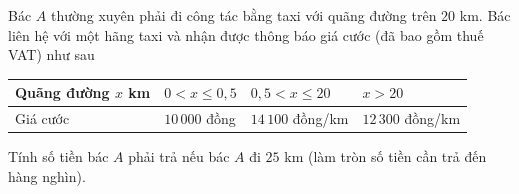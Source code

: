 \begin{bt}%
	Bác $A$ thường xuyên phải đi công tác bằng taxi với quãng đường trên $20$ km. Bác liên hệ với một hãng taxi và nhận được thông báo giá cước (đã bao gồm thuế VAT) như sau
	\begin{center}
		\begin{tabular}{*{4}{|>{\centering\arraybackslash}m{3.5cm}}|}
			\hline
			Quãng đường $x$ km & $0<x\leq 0{,}5$ & $0{,}5<x\leq 20$ & $x>20$\\
			\hline
			Giá cước & $10\,000$ đồng & $14\,100$ đồng/km & $12\,300$ đồng/km\\
			\hline
		\end{tabular}
	\end{center}
	Tính số tiền bác $A$ phải trả nếu bác $A$ đi $25$ km (làm tròn số tiền cần trả đến hàng nghìn).
\end{bt}

